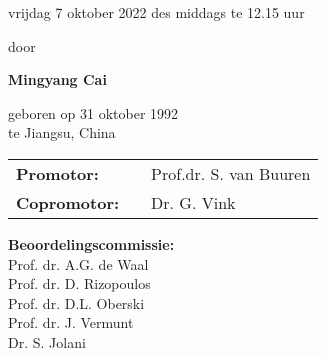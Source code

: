 \documentclass{class/svmono}
\begin{document}
{\begin{center}
			vrijdag 7 oktober 2022 des middags te 12.15 uur 
			
			\vspace{2cm}
			
			door           \\
			
			\vspace{.5cm}
			
			\textbf{Mingyang Cai}      \\
			
			\vspace{.5cm}
			
			geboren op 31 oktober 1992 \\
			te Jiangsu, China
		\end{center}
		
		\newpage
		\thispagestyle{empty}
		\begin{tabular}{lll}
			\textbf{Promotor:}    & & Prof.dr. S. van Buuren \\
			\textbf{Copromotor:} &  &   Dr. G. Vink \\      
		\end{tabular}
		\vspace{\fill}
		
		
		\newpage
		\thispagestyle{empty}
		\noindent \textbf{Beoordelingscommissie:} \\
		
		\noindent Prof. dr. A.G. de Waal\\
		Prof. dr. D. Rizopoulos\\
		Prof. dr. D.L. Oberski\\
		Prof. dr. J. Vermunt\\
		Dr. S. Jolani\\
		
}
\end{document}
